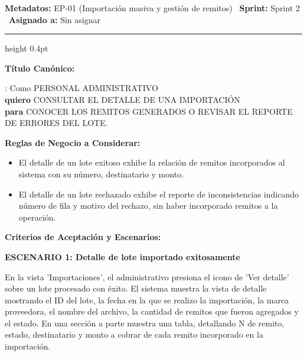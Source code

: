 \documentclass[a4paper,9pt]{article}
\begin{document}
\begin{tcolorbox}[hucard, title={\textbf{HU-38: VER DETALLE DE UNA IMPORTACIÓN} \hfill \scriptsize \colorbox{tealstatus}{\textbf{\ Accepted\ }} \quad \colorbox{white}{\textcolor{primarydark}{\textbf{\ 2 pts\ }}}}]
\vspace{-1pt}
\noindent\textbf{\footnotesize Metadatos:} EP-01 (Importación masiva y gestión de remitos) \textbar\ \textbf{Sprint:} Sprint 2 \textbar\ \textbf{Asignado a:} Sin asignar\par\vspace{2pt}
\hrule height 0.4pt\par\vspace{3pt}
\noindent\textbf{\footnotesize Título Canónico:}\par\vspace{1pt}
{\small : Como PERSONAL ADMINISTRATIVO \\ \textbf{quiero} CONSULTAR EL DETALLE DE UNA IMPORTACIÓN \\ \textbf{para} CONOCER LOS REMITOS GENERADOS O REVISAR EL REPORTE DE ERRORES DEL LOTE.}\par\vspace{3pt}
\noindent\textbf{\footnotesize Reglas de Negocio a Considerar:}\par\vspace{1pt}
{\footnotesize
\begin{itemize}[leftmargin=12pt, nosep, itemsep=1.5pt, topsep=1pt]
\item El detalle de un lote exitoso exhibe la relación de remitos incorporados al sistema con su número, destinatario y monto.
\item El detalle de un lote rechazado exhibe el reporte de inconsistencias indicando número de fila y motivo del rechazo, sin haber incorporado remitos a la operación.
\end{itemize}
}\par\vspace{3pt}
\noindent\textbf{\footnotesize Criterios de Aceptación y Escenarios:}\par\vspace{2pt}
{\footnotesize
\noindent\textbf{\textcolor{secondarydark}{ESCENARIO 1:  Detalle de lote importado exitosamente}}\par\vspace{1pt}
En la vista 'Importaciones', el administrativo presiona el icono de 'Ver detalle' sobre un lote procesado con éxito. El sistema muestra la vista de detalle mostrando el ID del lote, la fecha en la que se realizo la importación, la marca proveedora, el nombre del archivo, la cantidad de remitos que fueron agregados y el estado. En una sección a parte muestra una tabla, detallando N  de remito, estado, destinatario y monto a cobrar de cada remito incorporado en la importación.\par\vspace{2.5pt}
}
\end{tcolorbox}
\end{document}
